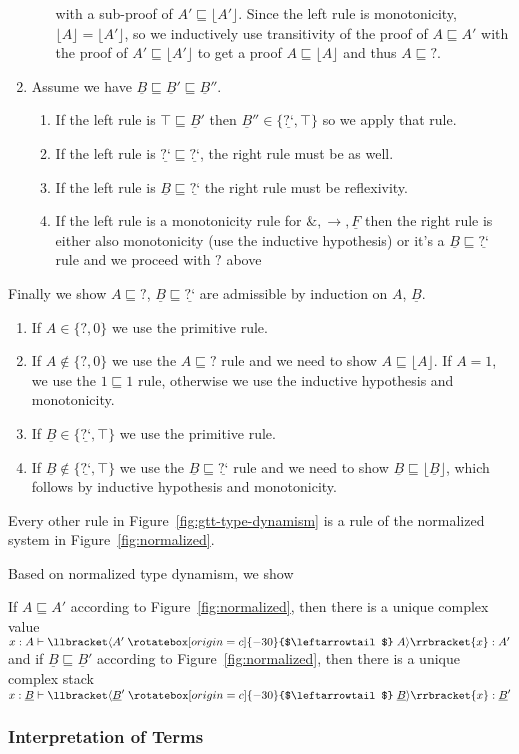 \documentclass[acmsmall,nonacm]{acmart}
\renewcommand{\u}{\underline}
\newcommand{\sem}[1]{\llbracket#1\rrbracket}
\newcommand{\supcast}[2]{\sem{\upcast{#1}{#2}}}
\newcommand{\floor}[1]{\lfloor#1\rfloor}
\newcommand{\ltdyn}{\sqsubseteq}
\newcommand{\dynv}{{?}}
\newcommand{\dync}{\u {\text{?`}}}
\newcommand{\uarrow}{\mathrel{\rotatebox[origin=c]{-30}{$\leftarrowtail$}}}
\newcommand{\upcast}[2]{\langle{#2}\uarrow{#1}\rangle}
\newcommand{\with}{\mathbin{\&}}
\begin{document}
\begin{longonly}
\begin{longproof}
\begin{enumerate}
\begin{enumerate}
      with a sub-proof of $A' \ltdyn \floor{A'}$. Since the left rule
      is monotonicity, $\floor{A} = \floor{A'}$, so we inductively use
      transitivity of the proof of $A \ltdyn A'$ with the proof of $A'
      \ltdyn \floor{A'}$ to get a proof $A \ltdyn \floor{A}$ and thus
      $A \ltdyn \dynv$.
    \end{enumerate}
  \item Assume we have $\u B \ltdyn \u B' \ltdyn \u B''$.
    \begin{enumerate}
    \item If the left rule is $\top \ltdyn \u B'$ then $\u B'' \in
      \{\dync, \top\}$ so we apply that rule.
    \item If the left rule is $\dync\ltdyn \dync$, the right rule must
      be as well.
    \item If the left rule is $\u B \ltdyn \dync$ the right rule must
      be reflexivity.
    \item If the left rule is a monotonicity rule for $\with, \to, \u
      F$ then the right rule is either also monotonicity (use the
      inductive hypothesis) or it's a $\u B \ltdyn \dync$ rule and we
      proceed with $\dynv$ above
    \end{enumerate}
  \end{enumerate}
  Finally we show $A \ltdyn \dynv$, $\u B \ltdyn \dync$ are admissible
  by induction on $A$, $\u B$.  
  \begin{enumerate}
  \item If $A \in \{ \dynv, 0\}$ we use the primitive rule.
  \item If $A \not\in \{ \dynv, 0 \}$ we use the $A \ltdyn \dynv$ rule
    and we need to show $A \ltdyn \floor A$. If $A = 1$, we use the
    $1\ltdyn 1$ rule, otherwise we use the inductive hypothesis and
    monotonicity.
  \item If $\u B \in \{ \dync, \top\}$ we use the primitive rule.
  \item If $\u B \not\in \{ \dync, \top \}$ we use the $\u B \ltdyn
    \dync$ rule and we need to show $\u B \ltdyn \floor {\u B}$, which
    follows by inductive hypothesis and monotonicity.
  \end{enumerate}
  Every other rule in Figure~\ref{fig:gtt-type-dynamism} is a rule of
  the normalized system in Figure~\ref{fig:normalized}.
\end{longproof}

Based on normalized type dynamism, we show
\begin{theorem}
If $A \ltdyn A'$ according to Figure~\ref{fig:normalized}, then there is
a unique complex value $x : A \vdash \supcast{A}{A'}{x} : A'$
and
if $\u B \ltdyn \u B'$ according to Figure~\ref{fig:normalized}, then there is
a unique complex stack $x : \u B \vdash \supcast{\u B}{\u B'}{x} : \u B'$
\end{theorem}

\smallskip
\subsubsection{Interpretation of Terms}~
\end{longonly}
\end{document}
